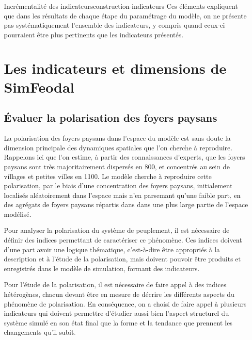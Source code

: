 \begin{encadre}{Incrémentalité des indicateurs}{construction-indicateurs}
Ces éléments expliquent que dans les résultats de chaque étape du paramétrage du modèle, on ne présente pas systématiquement l'ensemble des indicateurs, y compris quand ceux-ci pourraient être plus pertinents que les indicateurs présentés.
\end{encadre}


\pagebreak

\section{Les indicateurs et dimensions de SimFeodal}

\subsection{Évaluer la polarisation des foyers paysans \label{subsub:polarisation}}

La polarisation des foyers paysans dans l'espace du modèle est sans doute la dimension principale des dynamiques spatiales que l'on cherche à reproduire.
Rappelons ici que l'on estime, à partir des connaissances d'experts, que les foyers paysans sont très majoritairement dispersés en 800, et concentrés au sein de villages et petites villes en 1100.
Le modèle cherche à reproduire cette polarisation, par le biais d'une concentration des foyers paysans, initialement localisés aléatoirement dans l'espace mais n'en parsemant qu'une faible part, en des agrégats de foyers paysans répartis dans dans une plus large partie de l'espace modélisé.

Pour analyser la polarisation du système de peuplement, il est nécessaire de définir des indices permettant de caractériser ce phénomène.
Ces indices doivent d'une part avoir une logique thématique, c'est-à-dire être appropriés à la description et à l'étude de la polarisation, mais doivent  pouvoir être produits et enregistrés dans le modèle de simulation, formant des indicateurs.

Pour l'étude de la polarisation, il est nécessaire de faire appel à des indices hétérogènes, chacun devant être en mesure de décrire les différents aspects du phénomène de polarisation.
En conséquence, on a choisi de faire appel à plusieurs indicateurs qui doivent permettre d'étudier aussi bien l'aspect structurel du système simulé en son état final que la forme et la tendance que prennent les changements qu'il subit.

